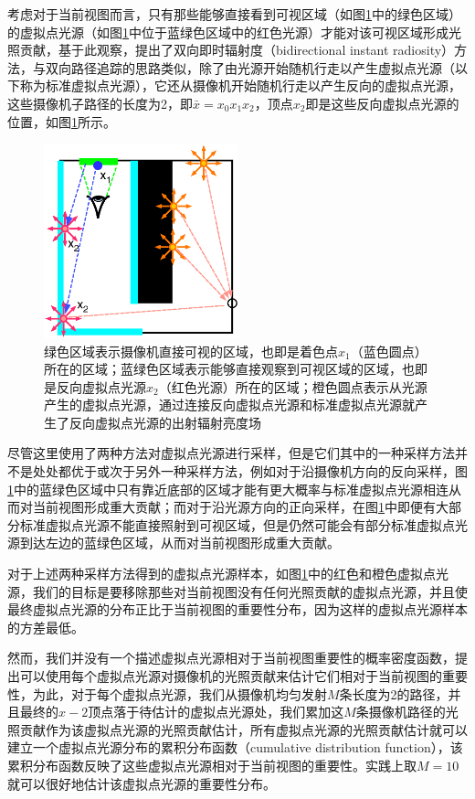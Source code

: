 考虑对于当前视图而言，只有那些能够直接看到可视区域（如图\ref{f:ir-bir}中的绿色区域）的虚拟点光源（如图\ref{f:ir-bir}中位于蓝绿色区域中的红色光源）才能对该可视区域形成光照贡献，基于此观察，\cite{a:BidirectionalInstantRadiosity}提出了双向即时辐射度（bidirectional instant radiosity）方法，与双向路径追踪的思路类似，除了由光源开始随机行走以产生虚拟点光源（以下称为标准虚拟点光源），它还从摄像机开始随机行走以产生反向的虚拟点光源，这些摄像机子路径的长度为2，即$\bar{x}=x_0x_1x_2$，顶点$x_2$即是这些反向虚拟点光源的位置，如图\ref{f:ir-bir}所示。

\begin{figure}
	\sidecaption
	\includegraphics[width=0.5\textwidth]{figures/ir/bir}
	\caption{绿色区域表示摄像机直接可视的区域，也即是着色点$x_1$（蓝色圆点）所在的区域；蓝绿色区域表示能够直接观察到可视区域的区域，也即是反向虚拟点光源$x_2$（红色光源）所在的区域；橙色圆点表示从光源产生的虚拟点光源，通过连接反向虚拟点光源和标准虚拟点光源就产生了反向虚拟点光源的出射辐射亮度场}
	\label{f:ir-bir}
\end{figure}

尽管这里使用了两种方法对虚拟点光源进行采样，但是它们其中的一种采样方法并不是处处都优于或次于另外一种采样方法，例如对于沿摄像机方向的反向采样，图\ref{f:ir-bir}中的蓝绿色区域中只有靠近底部的区域才能有更大概率与标准虚拟点光源相连从而对当前视图形成重大贡献；而对于沿光源方向的正向采样，在图\ref{f:ir-bir}中即便有大部分标准虚拟点光源不能直接照射到可视区域，但是仍然可能会有部分标准虚拟点光源到达左边的蓝绿色区域，从而对当前视图形成重大贡献。

对于上述两种采样方法得到的虚拟点光源样本，如图\ref{f:ir-bir}中的红色和橙色虚拟点光源，我们的目标是要移除那些对当前视图没有任何光照贡献的虚拟点光源，并且使最终虚拟点光源的分布正比于当前视图的重要性分布，因为这样的虚拟点光源样本的方差最低。

然而，我们并没有一个描述虚拟点光源相对于当前视图重要性的概率密度函数，\cite{a:BidirectionalInstantRadiosity}提出可以使用每个虚拟点光源对摄像机的光照贡献来估计它们相对于当前视图的重要性，为此，对于每个虚拟点光源，我们从摄像机均匀发射$M$条长度为2的路径，并且最终的$x-2$顶点落于待估计的虚拟点光源处，我们累加这$M$条摄像机路径的光照贡献作为该虚拟点光源的光照贡献估计，所有虚拟点光源的光照贡献估计就可以建立一个虚拟点光源分布的累积分布函数（cumulative distribution function），该累积分布函数反映了这些虚拟点光源相对于当前视图的重要性。实践上取$M=10$就可以很好地估计该虚拟点光源的重要性分布。


